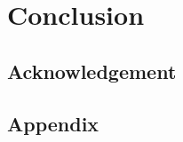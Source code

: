 \documentclass[a4paper,12pt]{scrreprt}
\newcounter{conclusion}[chapter]
\begin{document}
\chapter{Conclusion}



\section*{Acknowledgement}



\begin{appendices}
\chapter{Appendix}


\end{appendices}




\end{document}
